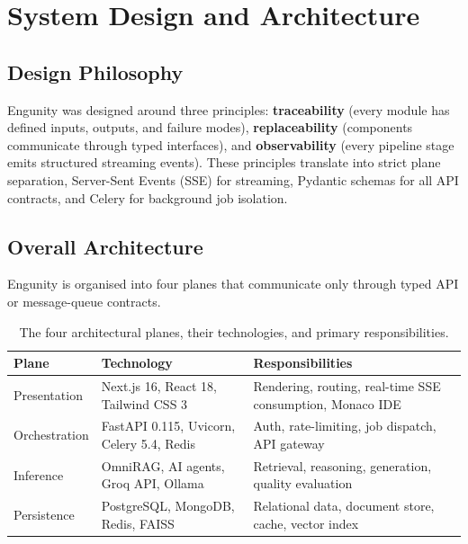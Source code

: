\chapter{System Design and Architecture}
\label{chap:design}

\section{Design Philosophy}
\label{sec:design-philosophy}

Engunity was designed around three principles: \textbf{traceability} (every module has defined inputs, outputs, and failure modes), \textbf{replaceability} (components communicate through typed interfaces), and \textbf{observability} (every pipeline stage emits structured streaming events). These principles translate into strict plane separation, Server-Sent Events (SSE) for streaming, Pydantic schemas for all API contracts, and Celery for background job isolation.

\section{Overall Architecture}
\label{sec:architecture}

Engunity is organised into four planes that communicate only through typed API or message-queue contracts.

\begin{table}[ht]
    \centering
    \caption{The four architectural planes, their technologies, and primary responsibilities.}
    \label{tab:planes}
    \renewcommand{\arraystretch}{1.3}
    \begin{tabular}{p{2.5cm} p{4cm} p{4.5cm}}
        \toprule
        \textbf{Plane} & \textbf{Technology} & \textbf{Responsibilities} \\
        \midrule
        Presentation   & Next.js 16, React 18, Tailwind CSS 3 & Rendering, routing, real-time SSE consumption, Monaco IDE \\
        Orchestration  & FastAPI 0.115, Uvicorn, Celery 5.4, Redis & Auth, rate-limiting, job dispatch, API gateway \\
        Inference      & OmniRAG, AI agents, Groq API, Ollama & Retrieval, reasoning, generation, quality evaluation \\
        Persistence    & PostgreSQL, MongoDB, Redis, FAISS & Relational data, document store, cache, vector index \\
        \bottomrule
    \end{tabular}
\end{table}

